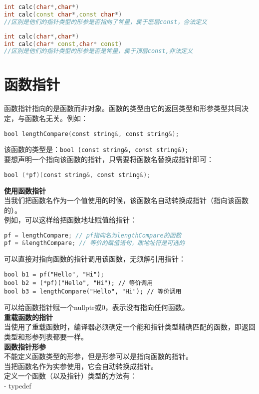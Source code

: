 \documentclass[
  a4paper,
  oneside,tablecaptionabove
]{scrbook}
\begin{document}
\begin{lstlisting}[language={C++}]
int calc(char*,char*)
int calc(const char*,const char*)
//区别是他们的指针类型的形参是否指向了常量，属于底层const，合法定义
\end{lstlisting}

\begin{lstlisting}[language={C++}]
int calc(char*,char*)
int calc(char* const,char* const)
//区别是他们的指针类型的形参是否是常量，属于顶层const,非法定义
\end{lstlisting}

\section{函数指针}\label{ux51fdux6570ux6307ux9488}

函数指针指向的是函数而非对象。函数的类型由它的返回类型和形参类型共同决定，与函数名无关。例如：

\begin{lstlisting}[language={C++}]
bool lengthCompare(const string&, const string&);
\end{lstlisting}

该函数的类型是：\lstinline!bool (const string&, const string&);!\\
要想声明一个指向该函数的指针，只需要将函数名替换成指针即可：

\begin{lstlisting}[language={C++}]
bool (*pf)(const string&, const string&);
\end{lstlisting}

\textbf{使用函数指针}\\
当我们把函数名作为一个值使用的时候，该函数名自动转换成指针（指向该函数的）。\\
例如，可以这样给把函数地址赋值给指针：

\begin{lstlisting}[language={C++}]
pf = lengthCompare; // pf指向名为lengthCompare的函数
pf = &lengthCompare; // 等价的赋值语句，取地址符是可选的
\end{lstlisting}

可以直接对指向函数的指针调用该函数，无须解引用指针：

\begin{lstlisting}
bool b1 = pf("Hello", "Hi");
bool b2 = (*pf)("Hello", "Hi"); // 等价调用
bool b3 = lengthCompare("Hello", "Hi"); // 等价调用
\end{lstlisting}

可以给函数指针赋一个nullptr或0，表示没有指向任何函数。\\
\textbf{重载函数的指针}\\
当使用了重载函数时，编译器必须确定一个能和指针类型精确匹配的函数，即返回类型和形参列表都要一样。\\
\textbf{函数指针形参}\\
不能定义函数类型的形参，但是形参可以是指向函数的指针。\\
当把函数名作为实参使用，它会自动转换成指针。\\
定义一个函数（以及指针）类型的方法有：\\
- typedef
\end{document}
